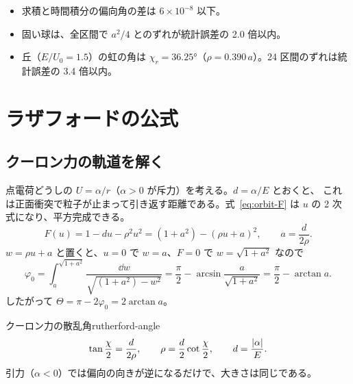 
\begin{itemize}
  \item 求積と時間積分の偏向角の差は $6\times10^{-8}$ 以下。
  \item 固い球は、全区間で $a^2/4$ とのずれが統計誤差の 2.0 倍以内。
  \item 丘（$E/U_0=1.5$）の虹の角は $\chi_r=\ang{36.25}$（$\rho=0.390\,a$）。24 区間のずれは統計誤差の 3.4 倍以内。
\end{itemize}

\section{ラザフォードの公式}\label{sec:coll-rutherford}

\subsection{クーロン力の軌道を解く}

点電荷どうしの $U=\alpha/r$（$\alpha>0$ が斥力）を考える。$d=\alpha/E$ とおくと、
これは正面衝突で粒子が止まって引き返す距離である。式~\eqref{eq:orbit-F} は $u$ の 2 次式になり、平方完成できる。
\begin{equation}
  F(u)=1-du-\rho^2u^2=(1+a^2)-(\rho u+a)^2,\qquad a=\frac{d}{2\rho}.
\end{equation}
$w=\rho u+a$ と置くと、$u=0$ で $w=a$、$F=0$ で $w=\sqrt{1+a^2}$ なので
\begin{equation}
  \varphi_0=\int_a^{\sqrt{1+a^2}}\frac{\dd w}{\sqrt{(1+a^2)-w^2}}
  =\frac\pi2-\arcsin\frac{a}{\sqrt{1+a^2}}=\frac\pi2-\arctan a .
\end{equation}
したがって $\Theta=\pi-2\varphi_0=2\arctan a$。

\begin{result}{クーロン力の散乱角}{rutherford-angle}
\begin{equation}
  \tan\frac\chi2=\frac{d}{2\rho},\qquad\rho=\frac d2\cot\frac\chi2,\qquad d=\frac{\left\lvert \alpha\right\rvert}{E}.
  \label{eq:rutherford-angle}
\end{equation}
引力（$\alpha<0$）では偏向の向きが逆になるだけで、大きさは同じである。
\end{result}


